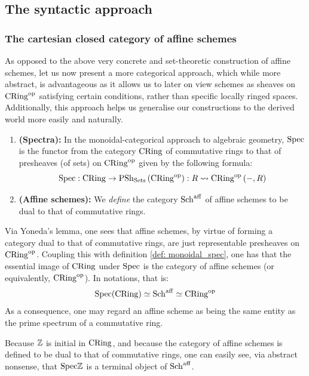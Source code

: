         \subsection{The syntactic approach}
            \subsubsection{The cartesian closed category of affine schemes} 
                As opposed to the above very concrete and set-theoretic construction of affine schemes, let us now present a more categorical approach, which while more abstract, is advantageous as it allows us to later on view schemes as sheaves on $\mathrm{CRing}^{\mathrm{op}}$ satisfying certain conditions, rather than specific locally ringed spaces. Additionally, this approach helps us generalise our constructions to the derived world more easily and naturally.
                
                \begin{definition} \label{def: monoidal_spec}
                    \noindent
                    \begin{enumerate}
                        \item \textbf{(Spectra):} In the monoidal-categorical approach to algebraic geometry, $\mathrm{Spec}$ is the functor from the category $\mathrm{CRing}$ of commutative rings to that of presheaves (of sets) on $\mathrm{CRing}^{\mathrm{op}}$ given by the following formula:
                            $$\mathrm{Spec}: \mathrm{CRing} \to \mathrm{PSh}_{\mathrm{Sets}}\left(\mathrm{CRing}^{\mathrm{op}}\right): R \leadsto \mathrm{CRing}^{\mathrm{op}}\left(-, R\right)$$
                        \item \textbf{(Affine schemes):} We \textit{define} the category $\mathrm{Sch}^{\mathrm{aff}}$ of affine schemes to be dual to that of commutative rings. 
                    \end{enumerate}
                \end{definition}
                \begin{remark}
                    Via Yoneda's lemma, one sees that affine schemes, by virtue of forming a category dual to that of commutative rings, are just representable presheaves on $\mathrm{CRing}^{\mathrm{op}}$. Coupling this with definition \ref{def: monoidal_spec}, one has that the essential image of $\mathrm{CRing}$ under $\mathrm{Spec}$ is the category of affine schemes (or equivalently, $\mathrm{CRing}^{\mathrm{op}}$). In notations, that is:
                        $$\mathrm{Spec}(\mathrm{CRing}) \simeq \mathrm{Sch}^{\mathrm{aff}} \simeq \mathrm{CRing}^{\mathrm{op}}$$
                    As a consequence, one may regard an affine scheme as being the same entity as the prime spectrum of a commutative ring.
                \end{remark}
                \begin{remark}
                    Because $\mathbb{Z}$ is initial in $\mathrm{CRing}$, and because the category of affine schemes is defined to be dual to that of commutative rings, one can easily see, via abstract nonsense, that $\mathrm{Spec} \mathbb{Z}$ is a terminal object of $\mathrm{Sch}^{\mathrm{aff}}$.
                \end{remark}
                

